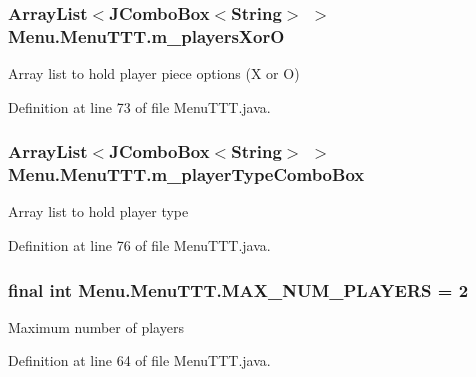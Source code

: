 \subsubsection[{m\+\_\+players\+Xor\+O}]{\setlength{\rightskip}{0pt plus 5cm}Array\+List$<$J\+Combo\+Box$<$String$>$ $>$ Menu.\+Menu\+T\+T\+T.\+m\+\_\+players\+Xor\+O\hspace{0.3cm}{\ttfamily [private]}}\label{class_menu_1_1_menu_t_t_t_a1f431306714855f214aacab632031a23}
Array list to hold player piece options (X or O) 

Definition at line 73 of file Menu\+T\+T\+T.\+java.

\hypertarget{class_menu_1_1_menu_t_t_t_a0d29323e5abc375ee10f1b27ecd6e1bd}{}
\subsubsection[{m\+\_\+player\+Type\+Combo\+Box}]{\setlength{\rightskip}{0pt plus 5cm}Array\+List$<$J\+Combo\+Box$<$String$>$ $>$ Menu.\+Menu\+T\+T\+T.\+m\+\_\+player\+Type\+Combo\+Box\hspace{0.3cm}{\ttfamily [private]}}\label{class_menu_1_1_menu_t_t_t_a0d29323e5abc375ee10f1b27ecd6e1bd}
Array list to hold player type 

Definition at line 76 of file Menu\+T\+T\+T.\+java.

\hypertarget{class_menu_1_1_menu_t_t_t_a634a62eb8c913decb22f2b27ad64e2b6}{}
\subsubsection[{M\+A\+X\+\_\+\+N\+U\+M\+\_\+\+P\+L\+A\+Y\+E\+R\+S}]{\setlength{\rightskip}{0pt plus 5cm}final int Menu.\+Menu\+T\+T\+T.\+M\+A\+X\+\_\+\+N\+U\+M\+\_\+\+P\+L\+A\+Y\+E\+R\+S = 2\hspace{0.3cm}{\ttfamily [private]}}\label{class_menu_1_1_menu_t_t_t_a634a62eb8c913decb22f2b27ad64e2b6}
Maximum number of players 

Definition at line 64 of file Menu\+T\+T\+T.\+java.



